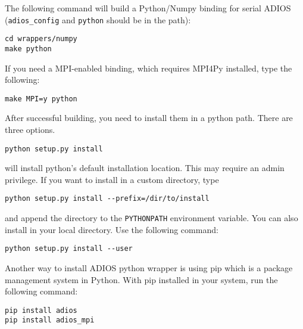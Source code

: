 The following command will build a Python/Numpy binding for serial ADIOS (\verb+adios_config+ and \verb+python+ should be in the path):
\begin{lstlisting}
cd wrappers/numpy
make python
\end{lstlisting}

If you need a MPI-enabled binding, which requires MPI4Py installed, type the following:

\begin{lstlisting}
make MPI=y python
\end{lstlisting}

After successful building, you need to install them in a python path. There are three options.

\begin{lstlisting}
python setup.py install
\end{lstlisting}
will install python's default installation location. This may require an admin privilege. If you want to install in a custom directory, type
\begin{lstlisting}
python setup.py install --prefix=/dir/to/install
\end{lstlisting}
and append the directory to the \verb+PYTHONPATH+ environment variable. You can also install in your local directory. Use the following command:
\begin{lstlisting}
python setup.py install --user
\end{lstlisting}

Another way to install ADIOS python wrapper is using pip which is a package management system in Python. With pip installed in your system, run the following command:

\begin{lstlisting}
pip install adios
pip install adios_mpi
\end{lstlisting}
